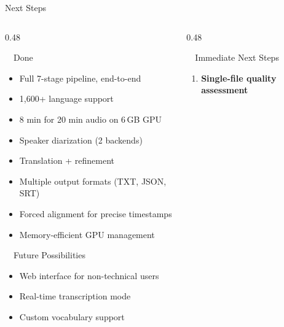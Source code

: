 \documentclass[aspectratio=169, 11pt]{beamer}
\begin{document}
\begin{frame}{Next Steps}
    \begin{columns}[T]
        \begin{column}{0.48\textwidth}
            \begin{exampleblock}{\faCheckCircle\ \ Done}
                \scriptsize
                \begin{itemize}
                    \item Full 7-stage pipeline, end-to-end
                    \item 1,600+ language support
                    \item 8 min for 20 min audio on 6\,GB GPU
                    \item Speaker diarization (2 backends)
                    \item Translation + refinement
                    \item Multiple output formats (TXT, JSON, SRT)
                    \item Forced alignment for precise timestamps
                    \item Memory-efficient GPU management
                \end{itemize}
            \end{exampleblock}
            \vspace{0.2em}
            \begin{block}{\faLightbulb\ \ Future Possibilities}
                \scriptsize
                \begin{itemize}
                    \item Web interface for non-technical users
                    \item Real-time transcription mode
                    \item Custom vocabulary support
                \end{itemize}
            \end{block}
        \end{column}
        \begin{column}{0.48\textwidth}
            \begin{alertblock}{\faArrowRight\ \ Immediate Next Steps}
                \scriptsize
                \begin{enumerate}
                    \item \textbf{Single-file quality assessment}\\

\end{enumerate}
\end{alertblock}
\end{column}
\end{columns}
\end{frame}
\end{document}
